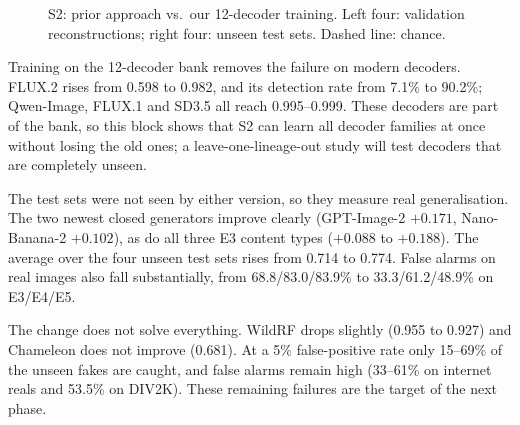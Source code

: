 \begin{figure}[H]
\centering
{}
\caption{S2: prior approach vs.\ our 12-decoder training. Left four: validation reconstructions; right four: unseen test sets. Dashed line: chance.}
\label{fig:s2}
\end{figure}

Training on the 12-decoder bank removes the failure on modern decoders. FLUX.2 rises from 0.598 to 0.982, and its detection rate from 7.1\% to 90.2\%; Qwen-Image, FLUX.1 and SD3.5 all reach 0.995--0.999. These decoders are part of the bank, so this block shows that S2 can learn all decoder families at once without losing the old ones; a leave-one-lineage-out study will test decoders that are completely unseen.

The test sets were not seen by either version, so they measure real generalisation. The two newest closed generators improve clearly (GPT-Image-2 $+0.171$, Nano-Banana-2 $+0.102$), as do all three E3 content types ($+0.088$ to $+0.188$). The average over the four unseen test sets rises from 0.714 to 0.774. False alarms on real images also fall substantially, from 68.8/83.0/83.9\% to 33.3/61.2/48.9\% on E3/E4/E5.

The change does not solve everything. WildRF drops slightly (0.955 to 0.927) and Chameleon does not improve (0.681). At a 5\% false-positive rate only 15--69\% of the unseen fakes are caught, and false alarms remain high (33--61\% on internet reals and 53.5\% on DIV2K). These remaining failures are the target of the next phase.

